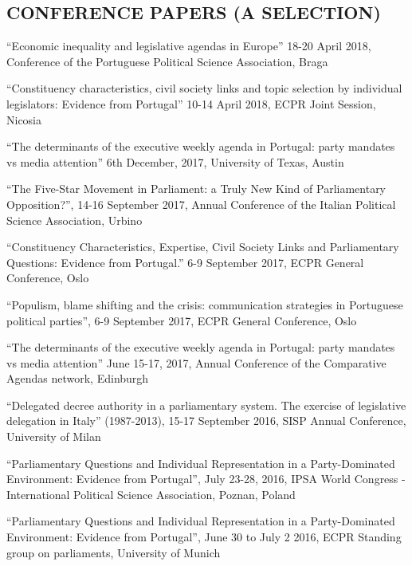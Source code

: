 \documentclass[11pt,]{article}
\renewenvironment{itemize}{
  \begin{list}{}{
    \setlength{\leftmargin}{1.5em}
  }
}{
  \end{list}
}
\begin{document}
\hypertarget{conference-papers-a-selection}{%
\subsection{CONFERENCE PAPERS (A
SELECTION)}\label{conference-papers-a-selection}}

\begin{itemize}
\item
  ``Economic inequality and legislative agendas in Europe'' 18-20 April
  2018, Conference of the Portuguese Political Science Association,
  Braga
\item
  ``Constituency characteristics, civil society links and topic
  selection by individual legislators: Evidence from Portugal'' 10-14
  April 2018, ECPR Joint Session, Nicosia
\item
  ``The determinants of the executive weekly agenda in Portugal: party
  mandates vs media attention'' 6th December, 2017, University of Texas,
  Austin
\item
  ``The Five-Star Movement in Parliament: a Truly New Kind of
  Parliamentary Opposition?'', 14-16 September 2017, Annual Conference
  of the Italian Political Science Association, Urbino
\item
  ``Constituency Characteristics, Expertise, Civil Society Links and
  Parliamentary Questions: Evidence from Portugal.'' 6-9 September 2017,
  ECPR General Conference, Oslo
\item
  ``Populism, blame shifting and the crisis: communication strategies in
  Portuguese political parties'', 6-9 September 2017, ECPR General
  Conference, Oslo
\item
  ``The determinants of the executive weekly agenda in Portugal: party
  mandates vs media attention'' June 15-17, 2017, Annual Conference of
  the Comparative Agendas network, Edinburgh
\item
  ``Delegated decree authority in a parliamentary system. The exercise
  of legislative delegation in Italy'' (1987-2013), 15-17 September
  2016, SISP Annual Conference, University of Milan
\item
  ``Parliamentary Questions and Individual Representation in a
  Party-Dominated Environment: Evidence from Portugal'', July 23-28,
  2016, IPSA World Congress - International Political Science
  Association, Poznan, Poland
\item
  ``Parliamentary Questions and Individual Representation in a
  Party-Dominated Environment: Evidence from Portugal'', June 30 to July
  2 2016, ECPR Standing group on parliaments, University of Munich

\end{itemize}
\end{document}
